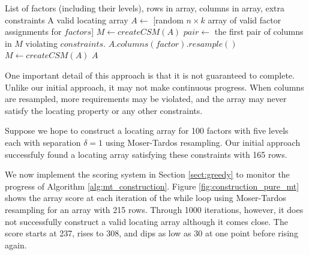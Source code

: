 \begin{algorithm}[pthb]
\caption{$\mathrm{Moser-Tardos\_Construction}(\mathit{factors},n,k,constraints)$}
\label{alg:mt_construction}

\begin{algorithmic}[1]
\REQUIRE List of factors (including their levels), rows in array, columns in array, extra constraints
\ENSURE A valid locating array
\STATE $A \gets$ [random $n \times k$ array of valid factor assignments for $factors$]
\STATE $M \gets createCSM(A)$
	\STATE $pair \gets$ the first pair of columns in $M$ violating $constraints$.
			\STATE $A.columns(factor).resample()$
		\ENDFOR
		\STATE $M \gets createCSM(A)$
	\ENDFOR
\ENDWHILE
\RETURN $A$
\end{algorithmic}
\end{algorithm}

One important detail of this approach is that it is not guaranteed to complete.
Unlike our initial approach, it may not make continuous progress.
When columns are resampled, more requirements may be violated, and the array may never satisfy the locating property or any other constraints.

Suppose we hope to construct a locating array for 100 factors with five levels each with separation $\delta=1$ using Moser-Tardos resampling.
Our initial approach successfuly found a locating array satisfying these constraints with 165 rows.

We now implement the scoring system in Section \ref{sect:greedy} to monitor the progress of Algorithm \ref{alg:mt_construction}.
Figure \ref{fig:construction_pure_mt} shows the array score at each iteration of the while loop using Moser-Tardos resampling for an array with 215 rows.
Through 1000 iterations, however, it does not successfully construct a valid locating array although it comes close.
The score starts at 237, rises to 308, and dips as low as 30 at one point before rising again.

